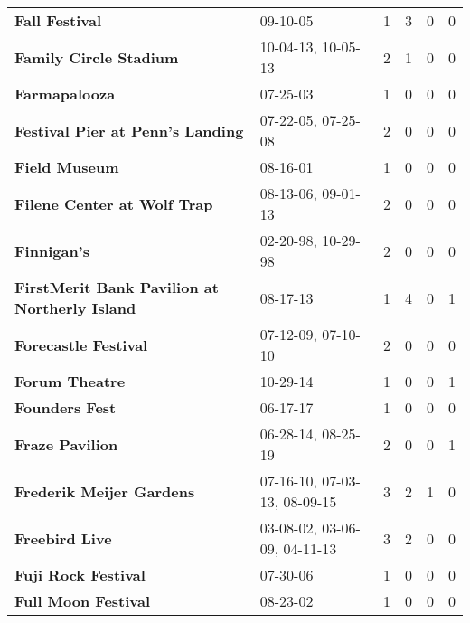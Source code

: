 \begin{supertabular}{llllll}
                                               \textbf{Fall Festival} &                      09-10-05 &  1 &   3 &  0 &  0 \\
                                       \textbf{Family Circle Stadium} &            10-04-13, 10-05-13 &  2 &   1 &  0 &  0 \\
                                                \textbf{Farmapalooza} &                      07-25-03 &  1 &   0 &  0 &  0 \\
                             \textbf{Festival Pier at Penn's Landing} &            07-22-05, 07-25-08 &  2 &   0 &  0 &  0 \\
                                                \textbf{Field Museum} &                      08-16-01 &  1 &   0 &  0 &  0 \\
                                  \textbf{Filene Center at Wolf Trap} &            08-13-06, 09-01-13 &  2 &   0 &  0 &  0 \\
                                                  \textbf{Finnigan's} &            02-20-98, 10-29-98 &  2 &   0 &  0 &  0 \\
                \textbf{FirstMerit Bank Pavilion at Northerly Island} &                      08-17-13 &  1 &   4 &  0 &  1 \\
                                         \textbf{Forecastle Festival} &            07-12-09, 07-10-10 &  2 &   0 &  0 &  0 \\
                                               \textbf{Forum Theatre} &                      10-29-14 &  1 &   0 &  0 &  1 \\
                                               \textbf{Founders Fest} &                      06-17-17 &  1 &   0 &  0 &  0 \\
                                              \textbf{Fraze Pavilion} &            06-28-14, 08-25-19 &  2 &   0 &  0 &  1 \\
                                     \textbf{Frederik Meijer Gardens} &  07-16-10, 07-03-13, 08-09-15 &  3 &   2 &  1 &  0 \\
                                               \textbf{Freebird Live} &  03-08-02, 03-06-09, 04-11-13 &  3 &   2 &  0 &  0 \\
                                          \textbf{Fuji Rock Festival} &                      07-30-06 &  1 &   0 &  0 &  0 \\
                                          \textbf{Full Moon Festival} &                      08-23-02 &  1 &   0 &  0 &  0 \\

\end{supertabular}
